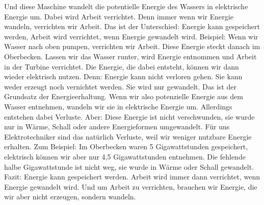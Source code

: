 \begin{frame}
{		Und diese Maschine wandelt die potentielle Energie des Wassers in elektrische Energie um.
		Dabei wird Arbeit verrichtet.
		Denn immer wenn wir Energie wandeln, verrichten wir Arbeit.
		Das ist der Unterschied:
		Energie kann gespeichert werden, Arbeit wird verrichtet, wenn Energie gewandelt wird.
		Beispiel:
		Wenn wir Wasser nach oben pumpen, verrichten wir Arbeit. Diese Energie steckt danach im Oberbecken.
		Lassen wir das Wasser runter, wird Energie entnommen und Arbeit in der Turbine verrichtet.
		Die Energie, die dabei entsteht, können wir dann wieder elektrisch nutzen.
		Denn: Energie kann nicht verloren gehen. Sie kann weder erzeugt noch vernichtet werden.
		Sie wird nur gewandelt. Das ist der Grundsatz der Energieerhaltung.
		Wenn wir also potenzielle Energie aus dem Wasser entnehmen, wandeln wir sie in elektrische Energie um.
		Allerdings entstehen dabei Verluste.
		Aber: Diese Energie ist nicht verschwunden, sie wurde nur in Wärme, Schall oder andere Energieformen umgewandelt.
		Für uns Elektrotechniker sind das natürlich Verluste, weil wir weniger nutzbare Energie erhalten.
		Zum Beispiel:
		Im Oberbecken waren 5 Gigawattstunden gespeichert, elektrisch können wir aber nur 4,5 Gigawattstunden entnehmen.
		Die fehlende halbe Gigawattstunde ist nicht weg, sie wurde in Wärme oder Schall gewandelt.
		Fazit:
		Energie kann gespeichert werden.
		Arbeit wird immer dann verrichtet, wenn Energie gewandelt wird.
		Und um Arbeit zu verrichten, brauchen wir Energie, die wir aber nicht erzeugen, sondern wandeln.
	}
\end{frame}

